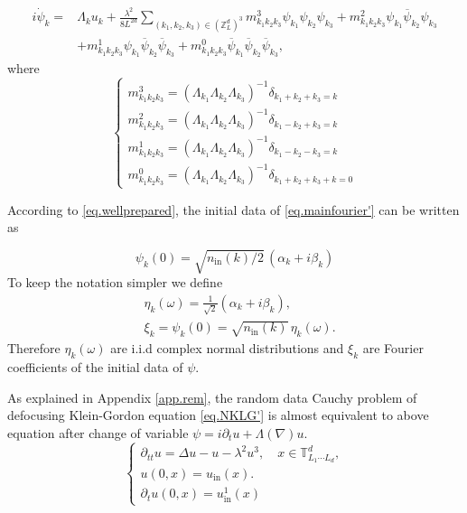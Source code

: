 \begin{equation}\label{eq.mainfourier'}
\begin{split}
i \dot{\psi}_{k} =& \Lambda_k u_k+\frac{\lambda^2}{8L^{2d}} \sum_{(k_1,k_2,k_{3}) \in (\mathbb{Z}^d_L)^3} m^{3}_{k_1k_2k_3}\psi_{k_1}\psi_{k_2}  \psi_{k_3}
+m^{2}_{k_1k_2k_3}\psi_{k_1}\overline{\psi}_{k_2}  \psi_{k_3}
\\
&+m^{1}_{k_1k_2k_3}\psi_{k_1}\overline{\psi}_{k_2}  \overline{\psi}_{k_3}
+m^{0}_{k_1k_2k_3}\overline{\psi}_{k_1}\overline{\psi}_{k_2}  \overline{\psi}_{k_3},
\end{split}
\end{equation}
where 
\begin{equation}
\begin{cases}
m^{3}_{k_1k_2k_3}=(\Lambda_{k_1}\Lambda_{k_2}\Lambda_{k_3})^{-1} \delta_{k_1 + k_2 +k_3 = k}
\\
m^{2}_{k_1k_2k_3}=(\Lambda_{k_1}\Lambda_{k_2}\Lambda_{k_3})^{-1} \delta_{k_1 - k_2 +k_3 = k}
\\
m^{1}_{k_1k_2k_3}=(\Lambda_{k_1}\Lambda_{k_2}\Lambda_{k_3})^{-1} \delta_{k_1 - k_2 -k_3 = k}
\\
m^{0}_{k_1k_2k_3}=(\Lambda_{k_1}\Lambda_{k_2}\Lambda_{k_3})^{-1} \delta_{k_1 + k_2 +k_3 + k =0}
\end{cases}
\end{equation}

According to \eqref{eq.wellprepared}, the initial data of \eqref{eq.mainfourier'} can be written as 

\begin{equation}
    \psi_k(0) =  \sqrt{n_{\textrm{in}}(k)/2} \,(\alpha_k+i\beta_k)
\end{equation}
To keep the notation simpler we define
\begin{equation}
\begin{split}
    &\eta_{k}(\omega)=\frac{1}{\sqrt{2}}(\alpha_k+i\beta_k),
    \\
    &\xi_k = \psi_k(0) = \sqrt{n_{\textrm{in}}(k)} \, \eta_{k}(\omega).
\end{split}
\end{equation}
Therefore $\eta_{k}(\omega)$ are i.i.d complex normal distributions and $\xi_k$ are Fourier coefficients of the initial data of $\psi$.

As explained in Appendix \ref{app.rem}, the random data Cauchy problem of defocusing Klein-Gordon equation \eqref{eq.NKLG'} is almost equivalent to above equation after change of variable $\psi=i\partial_tu+\Lambda(\nabla)u$.
\begin{equation}\label{eq.NKLG'}
\begin{cases}
\partial_{tt} u = \Delta u -u - \lambda^2 u^3,  \quad x\in \mathbb{T}^d_{L_1\cdots L_d},   \\[.6em]
u(0,x) = u_{\textrm{in}}(x).
\\[.6em]
\partial_tu(0,x) = u^{1}_{\textrm{in}}(x)
\end{cases}    
\end{equation}


